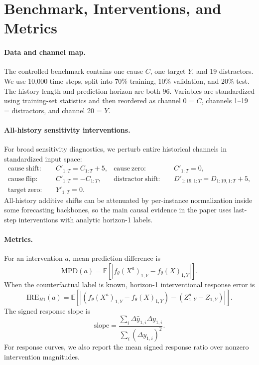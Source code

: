 \documentclass{article}
\newcommand{\ire}{\ensuremath{\mathrm{IRE}}}
\newcommand{\mpd}{\ensuremath{\mathrm{MPD}}}
\begin{document}
\fi

\clearpage




\appendix

\section{Benchmark, Interventions, and Metrics}
\label{app:benchmark}

\paragraph{Data and channel map.}
The controlled benchmark contains one cause $C$, one target $Y$, and 19
distractors. We use 10,000 time steps, split into 70\% training, 10\% validation,
and 20\% test. The history length and prediction horizon are both 96. Variables are
standardized using training-set statistics and then reordered as
channel 0 = $C$, channels 1--19 = distractors, and channel 20 = $Y$.

\paragraph{All-history sensitivity interventions.}
For broad sensitivity diagnostics, we perturb entire historical channels in
standardized input space:
\begin{align}
\mathrm{cause\ shift:}\quad & C'_{1:T}=C_{1:T}+5, &
\mathrm{cause\ zero:}\quad & C'_{1:T}=0, \\
\mathrm{cause\ flip:}\quad & C'_{1:T}=-C_{1:T}, &
\mathrm{distractor\ shift:}\quad & D'_{1:19,1:T}=D_{1:19,1:T}+5,\\
\mathrm{target\ zero:}\quad & Y'_{1:T}=0 .
\end{align}
All-history additive shifts can be attenuated by per-instance normalization inside
some forecasting backbones, so the main causal evidence in the paper uses last-step
interventions with analytic horizon-1 labels.

\paragraph{Metrics.}
For an intervention $a$, mean prediction difference is
\begin{equation}
\mpd(a)=
\mathbb{E}\left[
\left|f_\theta(X^a)_{1,Y}-f_\theta(X)_{1,Y}\right|
\right].
\end{equation}
When the counterfactual label is known, horizon-1 interventional response error is
\begin{equation}
\ire_{H1}(a)=
\mathbb{E}\left[
\left|
\left(f_\theta(X^a)_{1,Y}-f_\theta(X)_{1,Y}\right)
-
\left(Z^a_{1,Y}-Z_{1,Y}\right)
\right|
\right].
\end{equation}
The signed response slope is
\begin{equation}
\mathrm{slope}
=
\frac{\sum_i \Delta\hat{y}_{1,i}\Delta y_{1,i}}
{\sum_i(\Delta y_{1,i})^2}.
\end{equation}
For response curves, we also report the mean signed response ratio over nonzero
intervention magnitudes.
\end{document}
